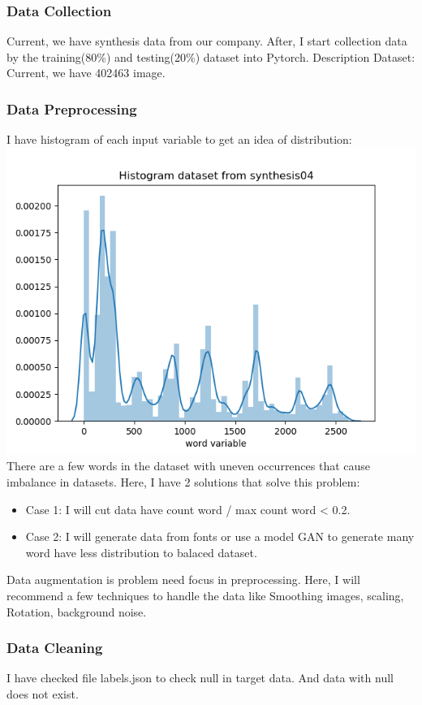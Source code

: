 \documentclass[14pt]{extarticle}
\newcommand{\<}{\langle}
\renewcommand{\>}{\rangle}
\theoremstyle{definition}
\begin{document}
\subsubsection{Data Collection}
Current, we have synthesis data from our company. After, I start collection data by the training(80\%) and testing(20\%) dataset into Pytorch.
Description Dataset: Current, we have 402463 image.
\subsubsection{Data Preprocessing}
I have histogram of each input variable to get an idea of distribution: \newline
\includegraphics[width=170mm,scale=0.7]{histogramdataset.png}
There are a few words in the dataset with uneven occurrences that cause imbalance in datasets. Here, I have 2 solutions that solve this problem: 
\begin{itemize}
    \item Case 1: I will cut data have count word / max count word < 0.2. 
    \item Case 2: I will generate data from fonts or use a model GAN to generate many word have less distribution to balaced dataset. 
\end{itemize}
Data augmentation is problem need focus in preprocessing. Here, I will recommend a few techniques to handle the data like Smoothing images, scaling, Rotation, background noise. \subsubsection{Data Cleaning}
I have checked file labels.json to check null in target data. And data with null does not exist.
\end{document}
